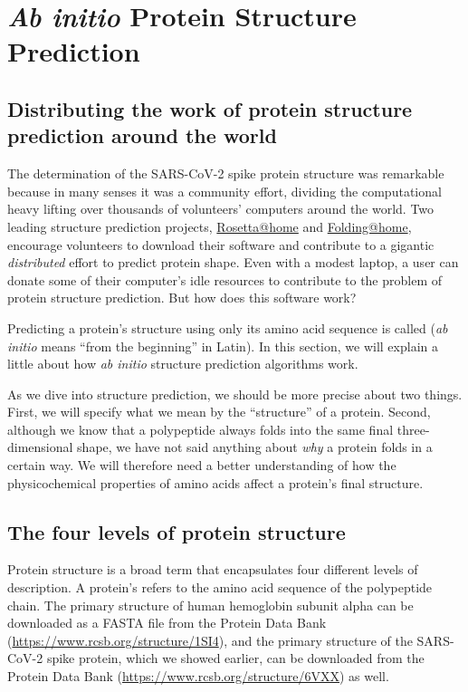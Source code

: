 \FloatBarrier
{}

\section{\textit{Ab initio} Protein Structure Prediction}
\label{sec:ab_initio}
\subsection{Distributing the work of protein structure prediction around the world}

The determination of the SARS-CoV-2 spike protein structure was remarkable because in many senses it was a community effort, dividing the computational heavy lifting over thousands of volunteers' computers around the world. Two leading structure prediction projects, \href{https://boinc.bakerlab.org}{Rosetta@home} and \href{https://foldingathome.org}{Folding@home}, encourage volunteers to download their software and contribute to a gigantic \textit{distributed} effort to predict protein shape. Even with a modest laptop, a user can donate some of their computer's idle resources to contribute to the problem of protein structure prediction. But how does this software work?

Predicting a protein’s structure using only its amino acid sequence is called  (\textit{ab initio} means “from the beginning” in Latin). In this section, we will explain a little about how \textit{ab initio} structure prediction algorithms work.

As we dive into structure prediction, we should be more precise about two things. First, we will specify what we mean by the ``structure'' of a protein. Second, although we know that a polypeptide always folds into the same final three-dimensional shape, we have not said anything about \textit{why} a protein folds in a certain way. We will therefore need a better understanding of how the physicochemical properties of amino acids affect a protein's final structure.

\FloatBarrier
{}
\subsection{The four levels of protein structure}

Protein structure is a broad term that encapsulates four different levels of description. A protein's  refers to the amino acid sequence of the polypeptide chain. The primary structure of human hemoglobin subunit alpha can be downloaded as a FASTA file from the Protein Data Bank (\url{https://www.rcsb.org/structure/1SI4}), and the primary structure of the SARS-CoV-2 spike protein, which we showed earlier, can be downloaded from the Protein Data Bank (\url{https://www.rcsb.org/structure/6VXX}) as well.

